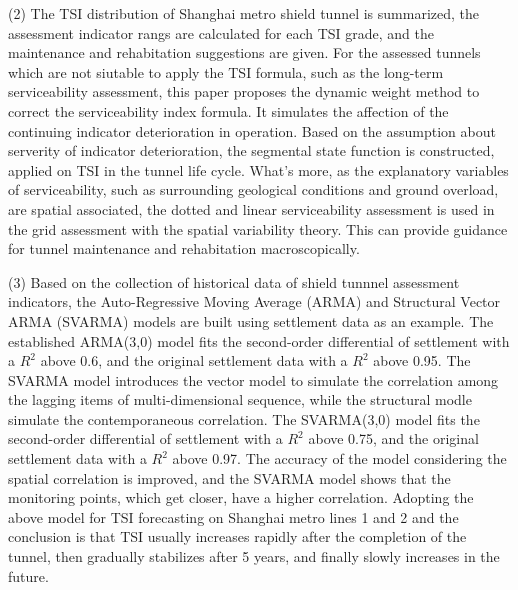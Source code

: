 \begin{eabstract}
(2) The TSI distribution of Shanghai metro shield tunnel is summarized, the assessment indicator rangs are calculated for each TSI grade, and the maintenance and rehabitation suggestions are given. For the assessed tunnels which are not siutable to apply the TSI formula, such as the long-term serviceability assessment, this paper proposes the dynamic weight method to correct the serviceability index formula. It simulates the affection of the continuing indicator deterioration in operation. Based on the assumption about serverity of indicator deterioration, the segmental state function is constructed, applied on TSI in the tunnel life cycle. What's more, as the explanatory variables of serviceability, such as surrounding geological conditions and ground overload, are spatial associated, the dotted and linear serviceability assessment is used in the grid assessment with the spatial variability theory. This can provide guidance for tunnel maintenance and rehabitation macroscopically.

(3) Based on the collection of historical data of shield tunnnel assessment indicators, the Auto-Regressive Moving Average (ARMA) and Structural Vector ARMA (SVARMA) models are built using settlement data as an example. The established ARMA(3,0) model fits the second-order differential of settlement with a $R^2$ above 0.6, and the original settlement data with a $R^2$ above 0.95. The SVARMA model introduces the vector model to simulate the correlation among the lagging items of multi-dimensional sequence, while the structural modle simulate the contemporaneous correlation. The SVARMA(3,0) model fits the second-order differential of settlement with a $R^2$ above 0.75, and the original settlement data with a $R^2$ above 0.97. The accuracy of the model considering the spatial correlation is improved, and the SVARMA model shows that the monitoring points, which get closer, have a higher correlation. Adopting the above model for TSI forecasting on Shanghai metro lines 1 and 2 and the conclusion is that TSI usually increases rapidly after the completion of the tunnel, then gradually stabilizes after 5 years, and finally slowly increases in the future.


\end{eabstract}
